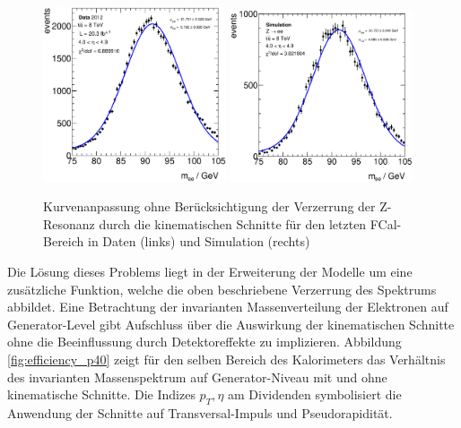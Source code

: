 \begin{figure}
    \centering
    \includegraphics[width=0.48\textwidth]{plots/bad_fit_data_p40}
    \hfill
    \includegraphics[width=0.48\textwidth]{plots/bad_fit_mc_p40}
    \caption[Kurvenanpassung ohne Berücksichtigung der Verzerrung der
        Z-Resonanz durch die kinematischen Schnitte]
        {Kurvenanpassung ohne Berücksichtigung der Verzerrung der Z-Resonanz
        durch die kinematischen Schnitte für den letzten \acs{FCal}-Bereich
        in Daten (links) und Simulation (rechts)}
    \label{fig:example_fits}
\end{figure}

Die Lösung dieses Problems liegt in der Erweiterung der Modelle um eine
zusätzliche
Funktion, welche die oben beschriebene Verzerrung des Spektrums abbildet. Eine
Betrachtung der invarianten Massenverteilung der Elektronen auf Generator-Level
gibt Aufschluss über die Auswirkung der kinematischen Schnitte ohne die
Beeinflussung durch Detektoreffekte zu implizieren. Abbildung
\ref{fig:efficiency_p40} zeigt für den selben Bereich des Kalorimeters das
Verhältnis des invarianten Massenspektrum auf Generator-Niveau mit und ohne
kinematische Schnitte. Die Indizes $p_T,\eta$ am Dividenden symbolisiert die
Anwendung der Schnitte auf Transversal-Impuls und Pseudorapidität.

